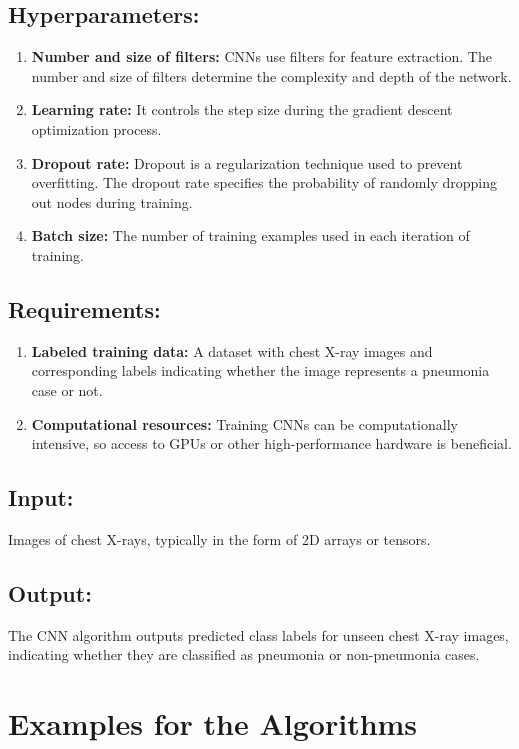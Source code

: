 \subsection{Hyperparameters:}

\begin{enumerate}
	\item \textbf{Number and size of filters: } CNNs use filters for feature extraction. The number and size of filters determine the complexity and depth of the network.\\
	\item \textbf{Learning rate:} It controls the step size during the gradient descent optimization process.\\
	\item \textbf{Dropout rate:} Dropout is a regularization technique used to prevent overfitting. The dropout rate specifies the probability of randomly dropping out nodes during training.\\
	\item \textbf{Batch size:} The number of training examples used in each iteration of training.\\
\end{enumerate}


\subsection{Requirements:}
\begin{enumerate}
	\item \textbf{Labeled training data:} A dataset with chest X-ray images and corresponding labels indicating whether the image represents a pneumonia case or not.\\
	\item \textbf{Computational resources:} Training CNNs can be computationally intensive, so access to GPUs or other high-performance hardware is beneficial.\\
\end{enumerate}

\subsection{Input:}
Images of chest X-rays, typically in the form of 2D arrays or tensors.\\

\subsection{Output:}
The CNN algorithm outputs predicted class labels for unseen chest X-ray images, indicating whether they are classified as pneumonia or non-pneumonia cases.\\

\section{Examples for the Algorithms}


